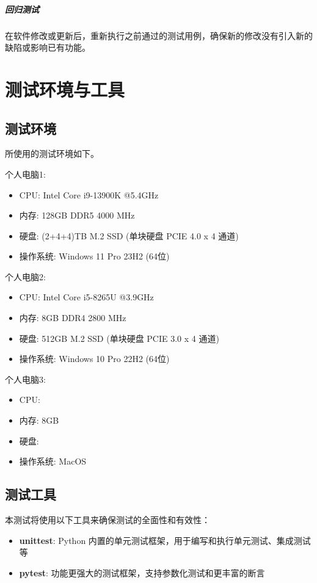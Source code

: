 \documentclass[a4paper,12pt]{report}	%
\begin{document}
\paragraph{回归测试}
在软件修改或更新后，重新执行之前通过的测试用例，确保新的修改没有引入新的缺陷或影响已有功能。

\chapter{测试环境与工具}

\section{测试环境}

所使用的测试环境如下。

个人电脑1:
\begin{itemize}
    \item CPU: Intel Core i9-13900K @5.4GHz 
    \item 内存: 128GB DDR5 4000 MHz 
    \item 硬盘: (2+4+4)TB M.2 SSD (单块硬盘 PCIE 4.0 x 4 通道)
    \item 操作系统: Windows 11 Pro 23H2 (64位)
\end{itemize}

个人电脑2:
\begin{itemize}
    \item CPU: Intel Core i5-8265U @3.9GHz 
    \item 内存: 8GB DDR4 2800 MHz
    \item 硬盘: 512GB M.2 SSD (单块硬盘 PCIE 3.0 x 4 通道)
    \item 操作系统: Windows 10 Pro 22H2 (64位)
\end{itemize}

个人电脑3: 
\begin{itemize}
    \item CPU: 
    \item 内存: 8GB 
    \item 硬盘: 
    \item 操作系统: MacOS 
\end{itemize}

\section{测试工具}

本测试将使用以下工具来确保测试的全面性和有效性：

\begin{itemize}
    \item \textbf{unittest}: Python 内置的单元测试框架，用于编写和执行单元测试、集成测试等
    \item \textbf{pytest}: 功能更强大的测试框架，支持参数化测试和更丰富的断言
\end{itemize}
\end{document}
